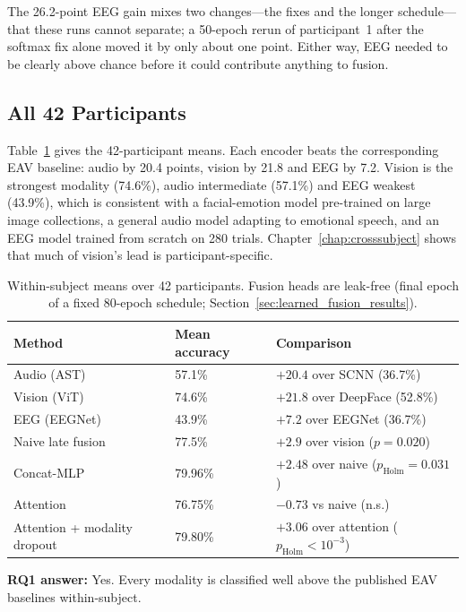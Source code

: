 The 26.2-point EEG gain mixes two changes---the fixes and the longer schedule---that these runs cannot separate; a 50-epoch rerun of participant~1 after the softmax fix alone moved it by only about one point. Either way, EEG needed to be clearly above chance before it could contribute anything to fusion.

\subsection{All 42 Participants}
Table~\ref{tab:full_rollout_accuracy} gives the 42-participant means. Each encoder beats the corresponding EAV baseline: audio by 20.4 points, vision by 21.8 and EEG by 7.2. Vision is the strongest modality (74.6\%), audio intermediate (57.1\%) and EEG weakest (43.9\%), which is consistent with a facial-emotion model pre-trained on large image collections, a general audio model adapting to emotional speech, and an EEG model trained from scratch on 280 trials. Chapter~\ref{chap:crosssubject} shows that much of vision's lead is participant-specific.

\begin{table}[htbp]
\centering
\small
\caption{Within-subject means over 42 participants. Fusion heads are leak-free (final epoch of a fixed 80-epoch schedule; Section~\ref{sec:learned_fusion_results}).}
\label{tab:full_rollout_accuracy}
\begin{tabular}{p{5.0cm} p{3.6cm} p{5.1cm}}
\hline
\textbf{Method} & \textbf{Mean accuracy} & \textbf{Comparison} \\
\hline
Audio (AST) & 57.1\% & $+20.4$ over SCNN (36.7\%) \\
Vision (ViT) & 74.6\% & $+21.8$ over DeepFace (52.8\%) \\
EEG (EEGNet) & 43.9\% & $+7.2$ over EEGNet (36.7\%) \\
Naive late fusion & 77.5\% & $+2.9$ over vision ($p = 0.020$) \\
Concat-MLP & 79.96\% & $+2.48$ over naive ($p_{\mathrm{Holm}} = 0.031$) \\
Attention & 76.75\% & $-0.73$ vs naive (n.s.) \\
Attention + modality dropout & 79.80\% & $+3.06$ over attention ($p_{\mathrm{Holm}} < 10^{-3}$) \\
\hline
\end{tabular}
\end{table}

\textbf{RQ1 answer:} Yes. Every modality is classified well above the published EAV baselines within-subject.

